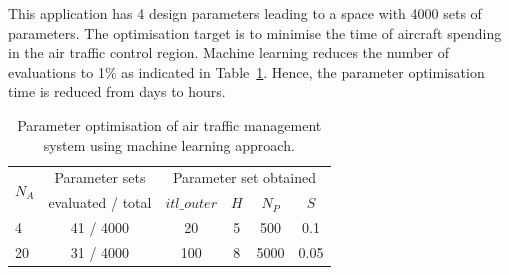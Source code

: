 This application has 4 design parameters leading to a space with 4000 sets of parameters.
The optimisation target is to minimise the time of aircraft spending in the air traffic control region.
Machine learning reduces the number of evaluations to 1\% as indicated in Table~\ref{tab:dse}.
Hence, the parameter optimisation time is reduced from days to hours.

\begin{table}[h]
	\begin{spacing}{1.0}
	\caption{Parameter optimisation of air traffic management system using machine learning approach.}
	\label{tab:dse}
	\centering
	\smallskip
	\begin{threeparttable}
		\begin{tabular}{l|c|c c c c}
			\hline
			\multirow{2}{*}{$N_A$}			& Parameter	sets		& \multicolumn{4}{|c}{Parameter set obtained} \\
			\cline{3-6}
																	& evaluated / total					& $itl\_outer$  		& $H$ & $N_P$ & $S$ \\
			\hline
			\hline
			4 													& 41 / 4000											& 20								&	5		&	500	  & 0.1 \\
			20													& 31 / 4000 											& 100								&	8		&	5000	& 0.05 \\
			\hline
		\end{tabular}
	\end{threeparttable}
	\end{spacing}
\end{table}

